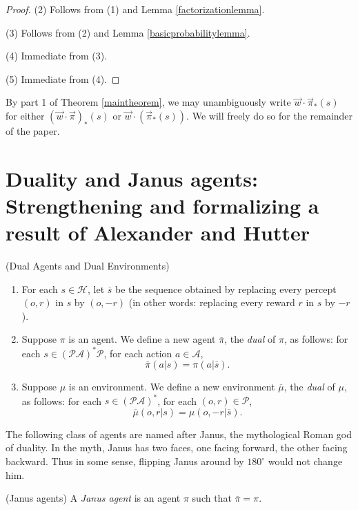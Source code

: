 \documentclass[runningheads]{llncs}
\begin{document}
\begin{proof}
    (2) Follows from (1) and Lemma \ref{factorizationlemma}.

    (3) Follows from (2) and Lemma \ref{basicprobabilitylemma}.

    (4) Immediate from (3).

    (5) Immediate from (4).
\end{proof}

By part 1 of Theorem \ref{maintheorem},
we may unambiguously write $\vec w\cdot \vec\pi_*(s)$
for either $(\vec w\cdot\vec\pi)_*(s)$ or $\vec w\cdot(\vec\pi_*(s))$.
We will freely do so for the remainder of the paper.

\section{Duality and Janus agents:
Strengthening and formalizing a result of Alexander and Hutter}

\begin{definition}
(Dual Agents and Dual Environments)
\begin{enumerate}
    \item
    For each $s\in\mathcal H$, let $\overline s$ be the sequence obtained
    by replacing every percept $(o,r)$ in $s$ by $(o,-r)$ (in other words:
    replacing every reward $r$ in $s$ by $-r$).
    \item
    Suppose $\pi$ is an agent.
    We define a new agent $\overline \pi$, the \emph{dual} of $\pi$,
    as follows:
    for each $s\in (\mathcal P\mathcal A)^*\mathcal P$,
    for each action $a\in\mathcal A$,
    \[\overline\pi(a|s)=\pi(a|\overline s).\]
    \item
    Suppose $\mu$ is an environment.
    We define a new environment $\overline\mu$, the \emph{dual} of $\mu$,
    as follows:
    for each $s\in (\mathcal P\mathcal A)^*$,
    for each $(o,r)\in\mathcal P$,
    \[\overline\mu(o,r|s)=\mu(o,-r|\overline s).\]
\end{enumerate}
\end{definition}

The following class of agents are named after Janus, the mythological
Roman god of duality. In the myth, Janus has two faces, one facing
forward, the other facing backward. Thus in some sense, flipping Janus
around by $180^\circ$ would not change him.

\begin{definition}
    (Janus agents)
    A \emph{Janus agent} is an agent $\pi$ such that
    $\overline{\pi}=\pi$.
\end{definition}
\end{document}
